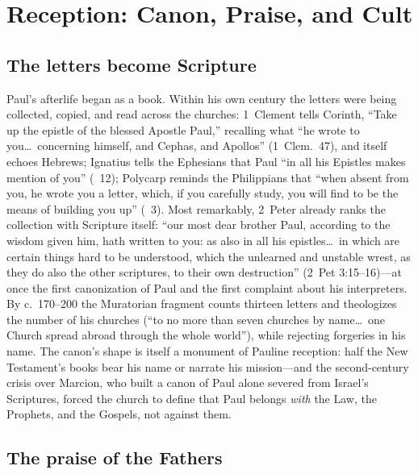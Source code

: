 \section{Reception: Canon, Praise, and Cult}

\subsection{The letters become Scripture}

Paul's afterlife began as a book. Within his own century the letters were
being collected, copied, and read across the churches: 1~Clement tells
Corinth, ``Take up the epistle of the blessed Apostle Paul,'' recalling
what ``he wrote to you\ldots\ concerning himself, and Cephas, and
Apollos'' (1~Clem.~47), and itself echoes Hebrews; Ignatius tells the
Ephesians that Paul ``in all his Epistles makes mention of you''
(~12); Polycarp reminds the Philippians that ``when
absent from you, he wrote you a letter, which, if you carefully study,
you will find to be the means of building you up'' (~3).
Most remarkably, 2~Peter already ranks the collection with Scripture
itself: ``our most dear brother Paul, according to the wisdom given him,
hath written to you: as also in all his epistles\ldots\ in which are
certain things hard to be understood, which the unlearned and unstable
wrest, as they do also the other scriptures, to their own destruction''
(2~Pet 3:15--16)---at once the first canonization of Paul and the first
complaint about his interpreters. By c.~170--200 the Muratorian fragment
counts thirteen letters and theologizes the number of his churches
(``to no more than seven churches by name\ldots\ one Church spread abroad
through the whole world''), while rejecting forgeries in his name. The
canon's shape is itself a monument of Pauline reception: half the New
Testament's books bear his name or narrate his mission---and the
second-century crisis over Marcion, who built a canon of Paul alone
severed from Israel's Scriptures, forced the church to define that Paul
belongs \emph{with} the Law, the Prophets, and the Gospels, not against
them.

\subsection{The praise of the Fathers}

